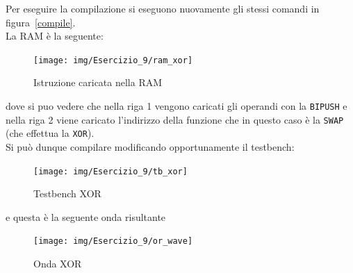 Per eseguire la compilazione si eseguono nuovamente gli stessi comandi in figura~\ref{compile}.\\
La RAM  è la seguente:
\begin{figure}[H]
	\centering
	\texttt{[image: img/Esercizio\_9/ram\_xor]}
	\caption{Istruzione caricata nella RAM}
	\label{ram_xor}
\end{figure}
dove si puo vedere che nella riga 1 vengono caricati gli operandi con la \texttt{BIPUSH} e nella riga 2 viene caricato l'indirizzo della funzione che in questo caso è la \texttt{SWAP} (che effettua la \texttt{XOR}).\\
Si può dunque compilare modificando opportunamente il testbench:
\begin{figure}[H]
	\centering
	\texttt{[image: img/Esercizio\_9/tb\_xor]}
	\caption{Testbench XOR}
	\label{tb_xor}
\end{figure}
e questa è la seguente onda risultante
\begin{figure}[H]
	\centering
	\texttt{[image: img/Esercizio\_9/or\_wave]}
	\caption{Onda XOR}
	\label{or_wave}
\end{figure}